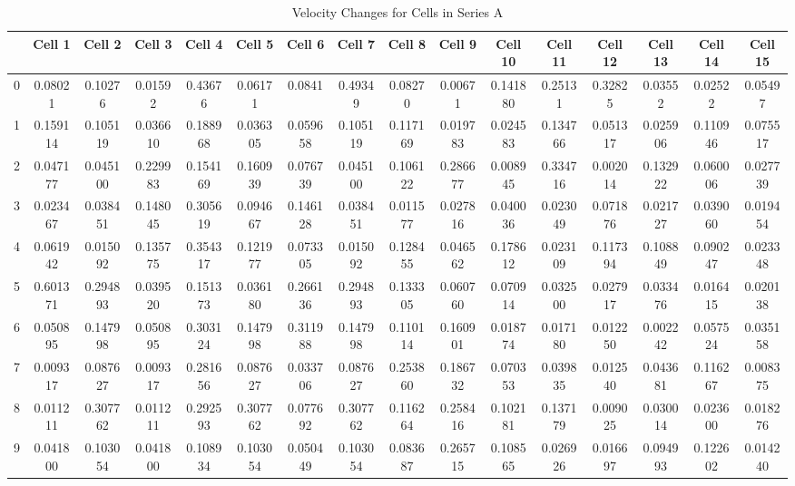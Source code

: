 \documentclass{article}
\begin{document}
\begin{landscape} %
\begin{table}[htbp]
\centering
\caption{Velocity Changes for Cells in Series A }
\label{tab:velocity_changes}
\begin{tabular}{cccccccccccccccc}
\toprule
 & \textbf{Cell 1} & \textbf{Cell 2} & \textbf{Cell 3} & \textbf{Cell 4} & \textbf{Cell 5} & \textbf{Cell 6} & \textbf{Cell 7} & \textbf{Cell 8} & \textbf{Cell 9} & \textbf{Cell 10} & \textbf{Cell 11} & \textbf{Cell 12} & \textbf{Cell 13} & \textbf{Cell 14} & \textbf{Cell 15} \\
\midrule
0 & 0.08021 & 0.10276 & 0.01592 & 0.43676 & 0.06171 & 0.0841 & 0.49349 & 0.08270 & 0.00671 & 0.141880 & 0.25131 & 0.32825 & 0.03552 & 0.02522 & 0.05497 \\
1 & 0.159114 & 0.105119 & 0.036610 & 0.188968 & 0.036305 & 0.059658 & 0.105119 & 0.117169 & 0.019783 & 0.024583 & 0.134766 & 0.051317 & 0.025906 & 0.110946 & 0.075517 \\
2 & 0.047177 & 0.045100 & 0.229983 & 0.154169 & 0.160939 & 0.076739 & 0.045100 & 0.106122 & 0.286677 & 0.008945 & 0.334716 & 0.002014 & 0.132922 & 0.060006 & 0.027739 \\
3 & 0.023467 & 0.038451 & 0.148045 & 0.305619 & 0.094667 & 0.146128 & 0.038451 & 0.011577 & 0.027816 & 0.040036 & 0.023049 & 0.071876 & 0.021727 & 0.039060 & 0.019454 \\
4 & 0.061942 & 0.015092 & 0.135775 & 0.354317 & 0.121977 & 0.073305 & 0.015092 & 0.128455 & 0.046562 & 0.178612 & 0.023109 & 0.117394 & 0.108849 & 0.090247 & 0.023348 \\
5 & 0.601371 & 0.294893 & 0.039520 & 0.151373 & 0.036180 & 0.266136 & 0.294893 & 0.133305 & 0.060760 & 0.070914 & 0.032500 & 0.027917 & 0.033476 & 0.016415 & 0.020138 \\
6 & 0.050895 & 0.147998 & 0.050895 & 0.303124 & 0.147998 & 0.311988 & 0.147998 & 0.110114 & 0.160901 & 0.018774 & 0.017180 & 0.012250 & 0.002242 & 0.057524 & 0.035158 \\
7 & 0.009317 & 0.087627 & 0.009317 & 0.281656 & 0.087627 & 0.033706 & 0.087627 & 0.253860 & 0.186732 & 0.070353 & 0.039835 & 0.012540 & 0.043681 & 0.116267 & 0.008375 \\
8 & 0.011211 & 0.307762 & 0.011211 & 0.292593 & 0.307762 & 0.077692 & 0.307762 & 0.116264 & 0.258416 & 0.102181 & 0.137179 & 0.009025 & 0.030014 & 0.023600 & 0.018276 \\
9 & 0.041800 & 0.103054 & 0.041800 & 0.108934 & 0.103054 & 0.050449 & 0.103054 & 0.083687 & 0.265715 & 0.108565 & 0.026926 & 0.016697 & 0.094993 & 0.122602 & 0.014240  \\

\end{tabular}
\end{table}
\end{landscape}
\end{document}
